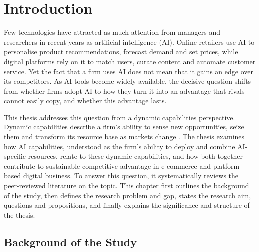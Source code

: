 
\chapter{Introduction}
\label{ch:intro}

Few technologies have attracted as much attention from managers and researchers in recent years as artificial intelligence (AI). Online retailers use AI to personalise product recommendations, forecast demand and set prices, while digital platforms rely on it to match users, curate content and automate customer service. Yet the fact that a firm uses AI does not mean that it gains an edge over its competitors. As AI tools become widely available, the decisive question shifts from whether firms adopt AI to how they turn it into an advantage that rivals cannot easily copy, and whether this advantage lasts.

This thesis addresses this question from a dynamic capabilities perspective. Dynamic capabilities describe a firm's ability to sense new opportunities, seize them and transform its resource base as markets change \parencite[1319]{teece2007}. The thesis examines how AI capabilities, understood as the firm's ability to deploy and combine AI-specific resources, relate to these dynamic capabilities, and how both together contribute to sustainable competitive advantage in e-commerce and platform-based digital business. To answer this question, it systematically reviews the peer-reviewed literature on the topic. This chapter first outlines the background of the study, then defines the research problem and gap, states the research aim, questions and propositions, and finally explains the significance and structure of the thesis.

\section{Background of the Study}
\label{sec:background}

